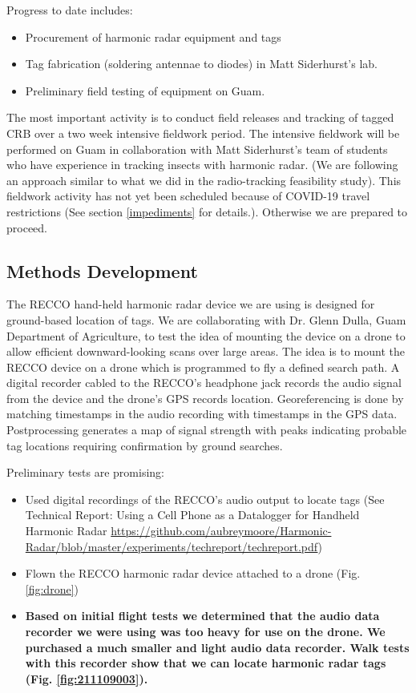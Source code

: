 \documentclass[12pt,letterpaper,english,bibliography=totocnumbered,abstract=on]{scrartcl}
\begin{document}
Progress to date includes:
\begin{itemize}
\item Procurement of harmonic radar equipment and tags
\item Tag fabrication (soldering antennae to diodes) in Matt Siderhurst's lab.
\item Preliminary field testing of equipment on Guam.
\end{itemize}

The most important activity is to conduct field releases and tracking of tagged CRB over a two week intensive fieldwork period. The intensive fieldwork will be performed on Guam in collaboration with Matt Siderhurst's team of students who have experience in tracking insects with harmonic radar. (We are following an approach similar to what we did in the radio-tracking feasibility study). This fieldwork activity has not yet been scheduled because of COVID-19 travel restrictions (See section \ref{impediments} for details.). Otherwise we are prepared to proceed.

\subsection{Methods Development}

The RECCO hand-held harmonic radar device we are using is designed for ground-based location of tags. We are collaborating with Dr. Glenn Dulla, Guam Department of Agriculture, to test the idea of mounting the device on a drone to allow efficient downward-looking scans over large areas. The idea is to mount the RECCO device on a drone which is programmed to fly a defined search path. A digital recorder cabled to the RECCO's headphone jack records the audio signal from the device and the drone's GPS  records location. Georeferencing is done by matching timestamps in the audio recording with timestamps in the GPS data. Postprocessing generates a map of signal strength with peaks indicating probable tag locations requiring confirmation by ground searches.

Preliminary tests are promising:
\begin{itemize}
	\item Used digital recordings of the RECCO's audio output to locate tags (See Technical Report: Using a Cell Phone as a Datalogger for Handheld Harmonic Radar \url{https://github.com/aubreymoore/Harmonic-Radar/blob/master/experiments/techreport/techreport.pdf})	
	\item Flown the RECCO harmonic radar device attached to a drone (Fig. \ref{fig:drone})
	\item \textbf{Based on initial flight tests we determined that the audio data recorder we were using was too heavy for use on the drone. We purchased a much smaller and light audio data recorder. Walk tests with this recorder show that we can locate harmonic radar tags (Fig. \ref{fig:211109003}).}
\end{itemize}
\end{document}
